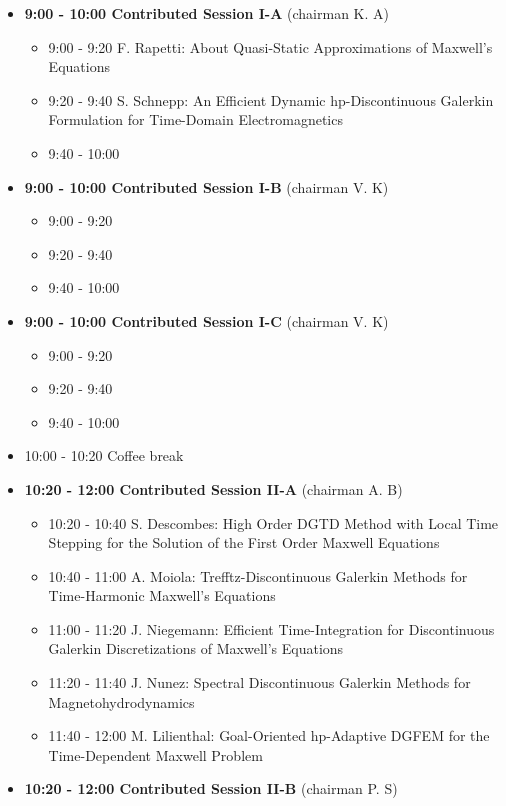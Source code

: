 \documentclass[10pt, A4]{article}%
\begin{document}
\begin{itemize}    
  \item {\bf 9:00 - 10:00 Contributed Session I-A} (chairman K. A) 
  \begin{itemize}
    \item 9:00 - 9:20 F. Rapetti: About Quasi-Static Approximations of Maxwell’s Equations
    \item 9:20 - 9:40 S. Schnepp: An Efficient Dynamic hp-Discontinuous Galerkin Formulation for Time-Domain Electromagnetics
    \item 9:40 - 10:00
  \end{itemize}
  \item {\bf 9:00 - 10:00 Contributed Session I-B} (chairman V. K) 
  \begin{itemize}
    \item 9:00 - 9:20 
    \item 9:20 - 9:40 
    \item 9:40 - 10:00
  \end{itemize}
    \item {\bf 9:00 - 10:00 Contributed Session I-C} (chairman V. K) 
  \begin{itemize}
    \item 9:00 - 9:20 
    \item 9:20 - 9:40
    \item 9:40 - 10:00 
  \end{itemize}
  \item 10:00 - 10:20 Coffee break
  \item {\bf 10:20 - 12:00 Contributed Session II-A} (chairman A. B) 
  \begin{itemize}
    \item 10:20 - 10:40 S. Descombes: High Order DGTD Method with Local Time Stepping for the Solution of the First Order Maxwell Equations
    \item 10:40 - 11:00 A. Moiola: Trefftz-Discontinuous Galerkin Methods for Time-Harmonic Maxwell’s Equations
    \item 11:00 - 11:20 J. Niegemann: Efficient Time-Integration for Discontinuous Galerkin Discretizations of Maxwell’s Equations
    \item 11:20 - 11:40 J. Nunez: Spectral Discontinuous Galerkin Methods for Magnetohydrodynamics
    \item 11:40 - 12:00 M. Lilienthal: Goal-Oriented hp-Adaptive DGFEM for the Time-Dependent Maxwell Problem
  \end{itemize}
  \item {\bf 10:20 - 12:00 Contributed Session II-B} (chairman P. S) 

\end{itemize}
\end{document}
